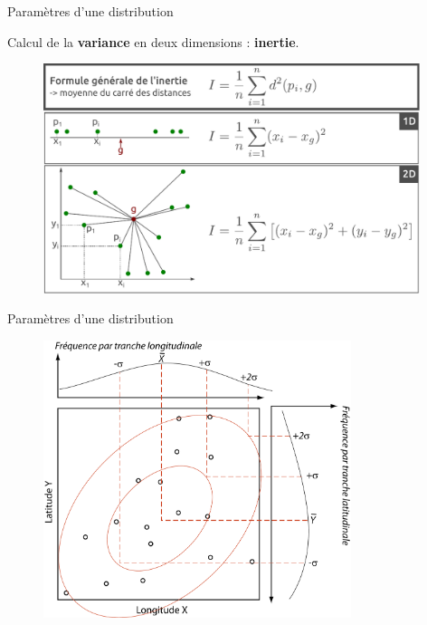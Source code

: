 \begin{frame}{Paramètres d'une distribution}

Calcul de la \textbf{variance} en deux dimensions : \textbf{inertie}.

\begin{figure}
\includegraphics[width=11cm]{Inertie.pdf}
\end{figure}


\end{frame}

\begin{frame}{Paramètres d'une distribution}

\begin{figure}
\includegraphics[width=9cm]{EllipseStandard.png}
\end{figure}

\end{frame}


